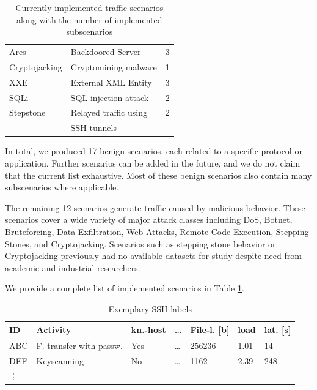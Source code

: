 \documentclass[runningheads]{llncs}
\begin{document}
\begin{table}
\begin{tabular}[t]{l|l|r}
 Ares & Backdoored Server & 3\\
 Cryptojacking & Cryptomining malware & 1\\
 XXE & External XML Entity & 3\\
 SQLi & SQL injection attack & 2 \\
 Stepstone & Relayed traffic using & 2\\
 &SSH-tunnels&\\
 \hline
\end{tabular}
\vspace{0.1cm} 
\caption{Currently implemented traffic scenarios along with the number of implemented subscenarios}
\label{tab:scen}
\end{table}



In total, we produced 17 benign scenarios, each related to a specific protocol or application. Further scenarios can be added in the future, and we do not claim that the current list exhaustive. Most of these benign scenarios also contain many subscenarios where applicable.

The remaining 12 scenarios generate traffic caused by malicious behavior. These scenarios cover a wide variety of major attack classes including DoS, Botnet, Bruteforcing, Data Exfiltration, Web Attacks, Remote Code Execution, Stepping Stones, and Cryptojacking. 
Scenarios such as stepping stone behavior or Cryptojacking previously had no available datasets for study despite need from academic and industrial researchers.


We provide a complete list of implemented scenarios in Table \ref{tab:scen}.



\begin{table}[h!]
\centering
\begin{tabular}{l|l|l|l|l|l|l}
ID& Activity & kn.-host &\dots &File-l. [b]& load&lat. [s]\\ \hline
ABC & F.-transfer with passw. &Yes&\dots &256236& 1.01 & 14 \\
DEF & Keyscanning &No&\dots &1162& 2.39 & 248 \\
\vdots
\end{tabular}
\caption{Exemplary SSH-labels}\label{Tab:Labels}
\end{table}



\end{document}
